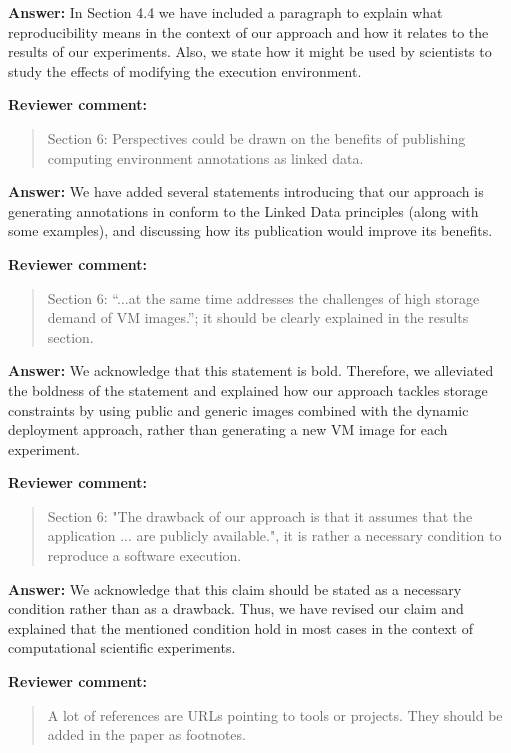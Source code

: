 \documentclass{letter}
\newenvironment{review}%
{\textbf{Reviewer comment:}\begin{quote}}%
{\end{quote}}%
\newcommand{\answer}[1]{%
      \textbf{Answer:} #1}
\begin{document}
\begin{letter}{}
\answer{In Section 4.4 we have included a paragraph to explain what reproducibility means in the context of our approach and how it relates to the results of our experiments. Also, we state how it might be used by scientists to study the effects of modifying the execution environment.}


\begin{review}
Section 6: Perspectives could be drawn on the benefits of publishing computing environment annotations as linked data.
\end{review}

\answer{We have added several statements introducing that our approach is generating annotations in conform to the Linked Data  principles (along with some examples), and discussing how its publication would improve its benefits.}


\begin{review}
Section 6: ``...at the same time addresses the challenges of high storage demand of VM images.''; it should be clearly explained in the results section.
\end{review}

\answer{We acknowledge that this statement is bold. Therefore, we alleviated the boldness of the statement and explained how our approach tackles storage constraints by using public and generic images combined with the dynamic deployment approach, rather than generating a new VM image for each experiment.}


\begin{review}
Section 6: "The drawback of our approach is that it assumes that the application ...  are publicly available.", it is rather a necessary condition to reproduce a software execution.
\end{review}

\answer{We acknowledge that this claim should be stated as a necessary condition rather than as a drawback. Thus, we have revised our claim and explained that the mentioned condition hold in most cases in the context of computational scientific experiments.}


\begin{review}
A lot of references are URLs pointing to tools or projects. They should be added in the paper as footnotes.
\end{review}


\end{letter}
\end{document}
